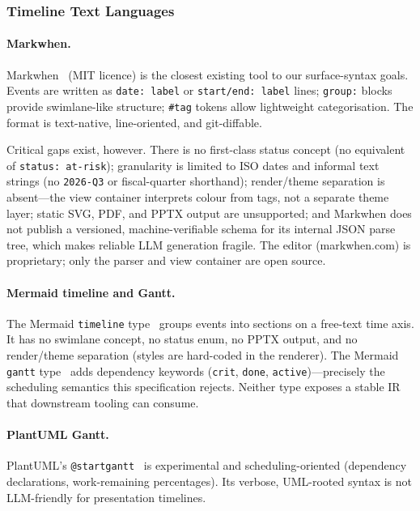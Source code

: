 \subsubsection{Timeline Text Languages}

\paragraph{Markwhen.}
Markwhen~\cite{markwhen} (MIT licence) is the closest existing tool to our
surface-syntax goals. Events are written as \texttt{date: label} or
\texttt{start/end: label} lines; \texttt{group:} blocks provide swimlane-like
structure; \texttt{\#tag} tokens allow lightweight categorisation. The format
is text-native, line-oriented, and git-diffable.

Critical gaps exist, however. There is no first-class status concept
(no equivalent of \texttt{status: at-risk}); granularity is limited to ISO
dates and informal text strings (no \texttt{2026-Q3} or fiscal-quarter
shorthand); render/theme separation is absent---the view container interprets
colour from tags, not a separate theme layer; static SVG, PDF, and PPTX output
are unsupported; and Markwhen does not publish a versioned, machine-verifiable
schema for its internal JSON parse tree, which makes reliable LLM generation
fragile. The editor (markwhen.com) is proprietary; only the parser and view
container are open source.

\paragraph{Mermaid timeline and Gantt.}
The Mermaid \texttt{timeline} type~\cite{mermaiddocs2024} groups events into
sections on a free-text time axis. It has no swimlane concept, no status enum,
no PPTX output, and no render/theme separation (styles are hard-coded in the
renderer). The Mermaid \texttt{gantt} type~\cite{mermaidgantt2024} adds
dependency keywords (\texttt{crit}, \texttt{done}, \texttt{active})---precisely
the scheduling semantics this specification rejects. Neither type exposes a
stable IR that downstream tooling can consume.

\paragraph{PlantUML Gantt.}
PlantUML's \texttt{@startgantt}~\cite{plantumlgantt} is experimental and
scheduling-oriented (dependency declarations, work-remaining percentages). Its
verbose, UML-rooted syntax is not LLM-friendly for presentation timelines.

